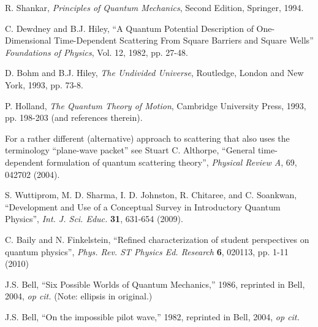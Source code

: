 \documentclass[aps,prc,onecolumn,letterpaper,floatfix,12pt]{revtex4}
\begin{document}
\begin{thebibliography}{99}
 R. Shankar, \emph{Principles of Quantum Mechanics},
  Second Edition, Springer, 1994.

 C. Dewdney and B.J. Hiley, ``A Quantum Potential
  Description of One-Dimensional Time-Dependent Scattering From Square
  Barriers and Square Wells'' \emph{Foundations of Physics}, Vol. 12,
  1982, pp. 27-48.  

 D. Bohm and B.J. Hiley, \emph{The Undivided Universe},
  Routledge, London and New York, 1993, pp. 73-8.

 P. Holland, \emph{The Quantum Theory of Motion},
  Cambridge University Press, 1993, pp. 198-203 (and references therein).


  For a rather different (alternative) approach to
  scattering that also uses the terminology ``plane-wave packet'' see
  Stuart C. Althorpe, ``General time-dependent formulation of quantum
  scattering theory'', \emph{Physical Review A}, 69, 042702 (2004).

 S. Wuttiprom, M. D. Sharma, I. D. Johnston, R. Chitaree, and C. Soankwan, ``Development and Use of a Conceptual Survey in Introductory Quantum Physics'', \emph{Int. J. Sci. Educ.} {\bf{31}}, 631-654 (2009).

 C. Baily and N. Finkelstein, ``Refined
  characterization of student perspectives on quantum physics'', 
\emph{Phys. Rev. ST Physics Ed. Research} {\bf{6}}, 020113, pp. 1-11 (2010)

 J.S. Bell, ``Six Possible Worlds of Quantum
  Mechanics,'' 1986, reprinted in Bell, 2004, \emph{op cit.}  (Note:
  ellipsis in original.)  

 J.S. Bell, ``On the impossible pilot wave,'' 1982,
  reprinted in Bell, 2004, \emph{op cit.}


\end{thebibliography}
\end{document}
